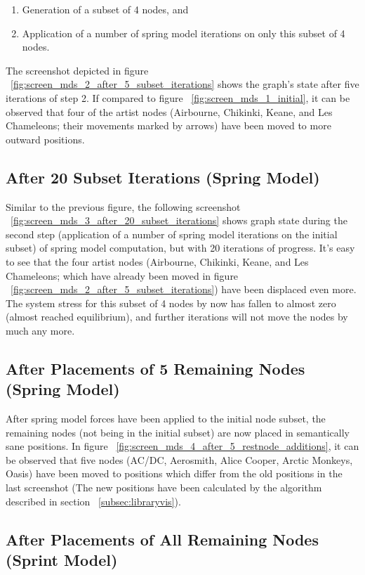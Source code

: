 \begin{enumerate}
	\item Generation of a subset of 4 nodes, and
	\item Application of a number of spring model iterations on only this subset of 4 nodes.
\end{enumerate}

The screenshot depicted in figure ~\ref{fig:screen_mds_2_after_5_subset_iterations} shows the graph's state after five iterations of step 2. If compared to figure ~\ref{fig:screen_mds_1_initial}, it can be observed that four of the artist nodes (Airbourne, Chikinki, Keane, and Les Chameleons; their movements marked by arrows) have been moved to more outward positions.

\subsection{After 20 Subset Iterations (Spring Model)}

Similar to the previous figure, the following screenshot ~\ref{fig:screen_mds_3_after_20_subset_iterations} shows graph state during the second step (application of a number of spring model iterations on the initial subset) of spring model computation, but with 20 iterations of progress. It's easy to see that the four artist nodes (Airbourne, Chikinki, Keane, and Les Chameleons; which have already been moved in figure ~\ref{fig:screen_mds_2_after_5_subset_iterations}) have been displaced even more. The system stress for this subset of 4 nodes by now has fallen to almost zero (almost reached equilibrium), and further iterations will not move the nodes by much any more.

\subsection{After Placements of 5 Remaining Nodes (Spring Model)}

After spring model forces have been applied to the initial node subset, the remaining nodes (not being in the initial subset) are now placed in semantically sane positions. In figure ~\ref{fig:screen_mds_4_after_5_restnode_additions}, it can be observed that five nodes (AC/DC, Aerosmith, Alice Cooper, Arctic Monkeys, Oasis) have been moved to positions which differ from the old positions in the last screenshot (The new positions have been calculated by the algorithm described in section ~\ref{subsec:libraryvis}). 

\subsection{After Placements of All Remaining Nodes (Sprint Model)}

